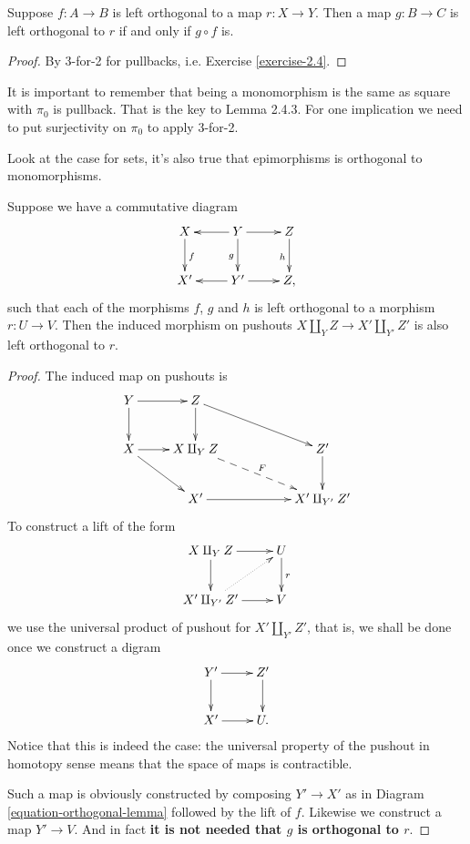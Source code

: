 \begin{lemma}
\label{lemma-orthogonality-and-composition}
Suppose $f:A \to B$ is left orthogonal
to a map $r:X \to Y$.
Then a map $g:B \to C$ is left
orthogonal to $r$ if and only if $g \circ f$ is.
\end{lemma}

\begin{proof}
By 3-for-2 for pullbacks, i.e. Exercise \ref{exercise-2.4}.
\end{proof}

It is important to remember that
being a monomorphism is the same
as square with $\pi_0$ is pullback.
That is the key to Lemma 2.4.3.
For one implication we need
to put surjectivity on $\pi_0$
to apply 3-for-2.

Look at the case for sets,
it's also true that epimorphisms
is orthogonal to monomorphisms.

\begin{lemma}
\label{lemma-orthogonality-for-pushout-diagram}
Suppose we have a commutative diagram
\begin{equation}
\label{equation-orthogonal-lemma}
\xymatrix{
X\ar[d]^f& Y \ar[l]\ar[d]_g \ar[r]& Z\ar[d]_h\\
X'&Y' \ar[l]\ar[r]&Z,
}
\end{equation}
such that each of the morphisms $f$, $g$ and $h$ 
is left orthogonal to a morphism $r:U \to V$.
Then the induced morphism on pushouts
$X \amalg_Y Z \to X' \amalg_{Y'}Z'$ is
also left orthogonal to $r$.
\end{lemma}

\begin{proof}
The induced map on pushouts is
$$
\xymatrix{
Y \ar[r] \ar[d] & Z \ar[d] \ar[rrd] & & \\
X \ar[r] \ar[rd]& X \amalg_Y Z \ar@{-->}[rrd]^F & & Z'\ar[d] \\
&X'\ar[rr]& & X' \amalg_{Y'}Z'
}
$$
To construct a lift of the form
$$
\xymatrix{
X \amalg_Y Z\ar[r]\ar[d]&U\ar[d]^r\\
X' \amalg_{Y'}Z'\ar[r]\ar@{.>}[ur]&V
}
$$
we use the universal product of pushout for $X' \amalg_{Y'}Z'$,
that is, we shall be done once we construct a digram
$$
\xymatrix{
Y'\ar[r]\ar[d]&Z'\ar[d]\\
X'\ar[r]&U.
}
$$
Notice that this is indeed the case:
the universal property of the pushout
in homotopy sense means that the space of maps
is contractible.

Such a map is obviously constructed by
composing $Y' \to X'$ as in Diagram \ref{equation-orthogonal-lemma}
followed by the lift of $f$. Likewise
we construct a map  $Y'\to V$.
And in fact
{\bf it is not needed that $g$ is orthogonal to $r$}.
\end{proof}

